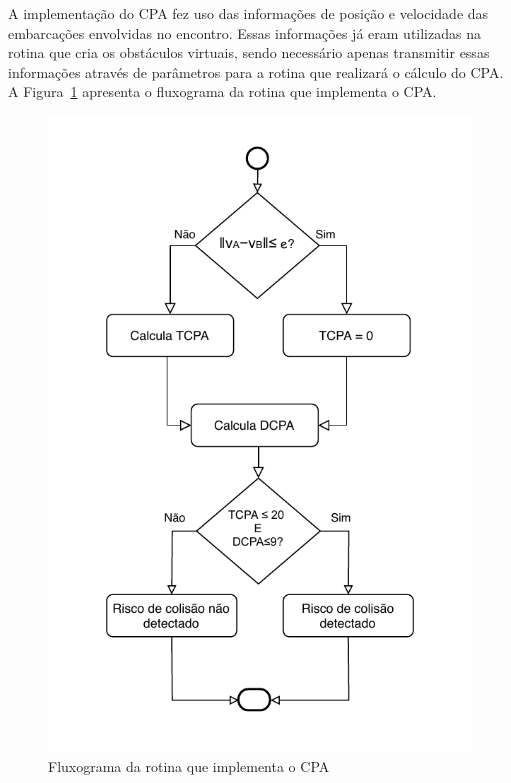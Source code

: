     A implementação do CPA fez uso das informações de posição e velocidade das embarcações envolvidas no encontro. Essas informações já eram utilizadas na rotina que cria os obstáculos virtuais, sendo necessário apenas transmitir essas informações através de parâmetros para a rotina que realizará o cálculo do CPA. A Figura~\ref{fig:chap4_fluxograma_cpa} apresenta o fluxograma da rotina que implementa o CPA. 
    
    \begin{figure}
        \centering
        \includegraphics{fig/chap4/fluxograma_cpa.pdf}
        \caption{Fluxograma da rotina que implementa o CPA}
        \label{fig:chap4_fluxograma_cpa}
    \end{figure}
    
